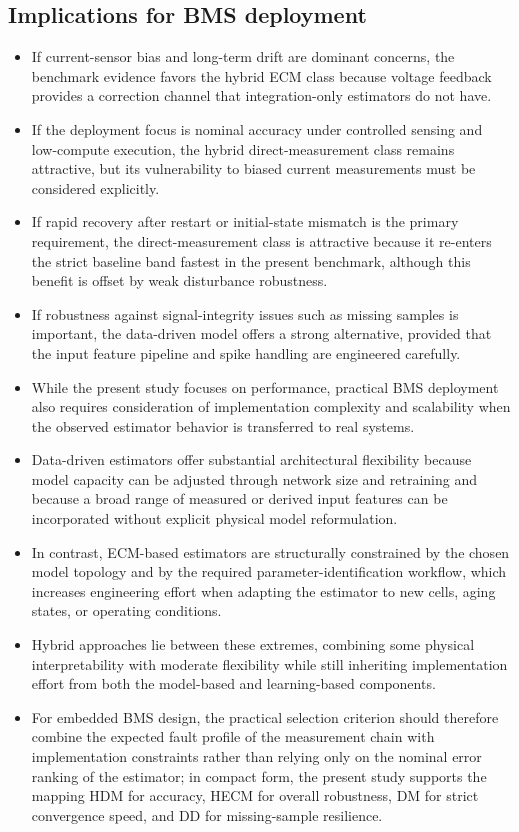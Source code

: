 \documentclass[review,nopreprintline]{elsarticle}
\begin{document}
\subsection{Implications for BMS deployment}
\begin{itemize}[leftmargin=*]
    \item If current-sensor bias and long-term drift are dominant concerns, the benchmark evidence favors the hybrid ECM class because voltage feedback provides a correction channel that integration-only estimators do not have.
    \item If the deployment focus is nominal accuracy under controlled sensing and low-compute execution, the hybrid direct-measurement class remains attractive, but its vulnerability to biased current measurements must be considered explicitly.
    \item If rapid recovery after restart or initial-state mismatch is the primary requirement, the direct-measurement class is attractive because it re-enters the strict baseline band fastest in the present benchmark, although this benefit is offset by weak disturbance robustness.
    \item If robustness against signal-integrity issues such as missing samples is important, the data-driven model offers a strong alternative, provided that the input feature pipeline and spike handling are engineered carefully.
    \item While the present study focuses on performance, practical BMS deployment also requires consideration of implementation complexity and scalability when the observed estimator behavior is transferred to real systems.
    \item Data-driven estimators offer substantial architectural flexibility because model capacity can be adjusted through network size and retraining and because a broad range of measured or derived input features can be incorporated without explicit physical model reformulation.
    \item In contrast, ECM-based estimators are structurally constrained by the chosen model topology and by the required parameter-identification workflow, which increases engineering effort when adapting the estimator to new cells, aging states, or operating conditions.
    \item Hybrid approaches lie between these extremes, combining some physical interpretability with moderate flexibility while still inheriting implementation effort from both the model-based and learning-based components.
    \item For embedded BMS design, the practical selection criterion should therefore combine the expected fault profile of the measurement chain with implementation constraints rather than relying only on the nominal error ranking of the estimator; in compact form, the present study supports the mapping HDM for accuracy, HECM for overall robustness, DM for strict convergence speed, and DD for missing-sample resilience.
\end{itemize}
\end{document}
